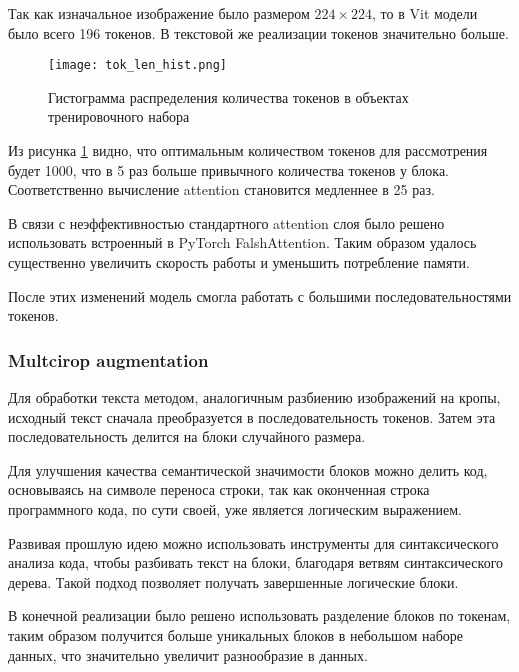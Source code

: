 \documentclass[../part_2.tex]{subfiles}
\begin{document}
    \par Так как изначальное изображение было размером $224\times224$, то в Vit модели было всего 196 токенов. В текстовой же реализации токенов значительно больше.
    \begin{figure}[H]
        \centering
        \texttt{[image: tok\_len\_hist.png]}
        \caption{Гистограмма распределения количества токенов в объектах тренировочного набора}
        \label{fig:tok_len_hist}
    \end{figure}
    \par Из рисунка \ref{fig:tok_len_hist} видно, что оптимальным количеством токенов для рассмотрения будет 1000, что в 5 раз больше привычного количества токенов у блока. Соответственно вычисление attention становится медленнее в 25 раз.
    \par В связи с неэффективностью стандартного attention слоя было решено использовать встроенный в PyTorch FalshAttention\cite{dao2022flashattentionfastmemoryefficientexact}. Таким образом удалось существенно увеличить скорость работы и уменьшить потребление памяти.
    \par После этих изменений модель смогла работать с большими последовательностями токенов.

    \subsubsection{Multcirop augmentation}
    \par Для обработки текста методом, аналогичным разбиению изображений на кропы, исходный текст сначала преобразуется в последовательность токенов. Затем эта последовательность делится на блоки случайного размера.
    \par Для улучшения качества семантической значимости блоков можно делить код, основываясь на символе переноса строки, так как оконченная строка программного кода, по сути своей, уже является логическим выражением.
    \par Развивая прошлую идею можно использовать инструменты для синтаксического анализа кода, чтобы разбивать текст на блоки, благодаря ветвям синтаксического дерева. Такой подход позволяет получать завершенные логические блоки.
    \par В конечной реализации было решено использовать разделение блоков по токенам, таким образом получится больше уникальных блоков в небольшом наборе данных, что значительно увеличит разнообразие в данных.
\end{document}
